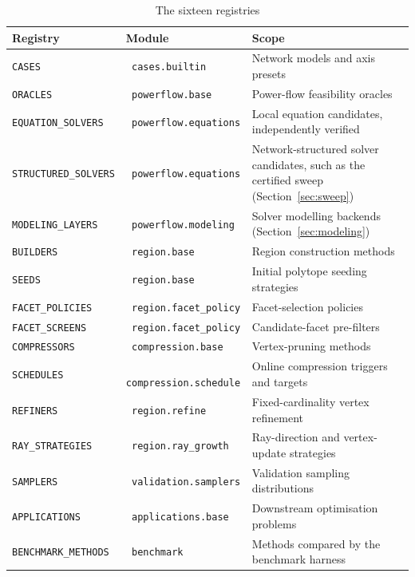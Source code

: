 \documentclass[11pt,a4paper]{report}
\newcommand{\code}[1]{\texttt{\small #1}}
\newcommand{\pymod}[1]{\texttt{\small\color{nbblue} #1}}
\begin{document}
\begin{table}[h]
\centering\small
\caption{The sixteen registries}
\begin{tabular}{@{}llp{6.4cm}@{}}
\toprule
Registry & Module & Scope \\
\midrule
\code{CASES}           & \pymod{cases.builtin}        & Network models and axis presets \\
\code{ORACLES}         & \pymod{powerflow.base}       & Power-flow feasibility oracles \\
\code{EQUATION\_SOLVERS} & \pymod{powerflow.equations} & Local equation candidates, independently verified \\
\code{STRUCTURED\_SOLVERS} & \pymod{powerflow.equations} & Network-structured solver candidates, such as the certified sweep (Section~\ref{sec:sweep}) \\
\code{MODELING\_LAYERS} & \pymod{powerflow.modeling} & Solver modelling backends (Section~\ref{sec:modeling}) \\
\code{BUILDERS}        & \pymod{region.base}          & Region construction methods \\
\code{SEEDS}           & \pymod{region.base}          & Initial polytope seeding strategies \\
\code{FACET\_POLICIES} & \pymod{region.facet\_policy} & Facet-selection policies \\
\code{FACET\_SCREENS}  & \pymod{region.facet\_policy} & Candidate-facet pre-filters \\
\code{COMPRESSORS}     & \pymod{compression.base}     & Vertex-pruning methods \\
\code{SCHEDULES}       & \pymod{compression.schedule} & Online compression triggers and targets \\
\code{REFINERS}        & \pymod{region.refine}        & Fixed-cardinality vertex refinement \\
\code{RAY\_STRATEGIES} & \pymod{region.ray\_growth}   & Ray-direction and vertex-update strategies \\
\code{SAMPLERS}        & \pymod{validation.samplers}  & Validation sampling distributions \\
\code{APPLICATIONS}    & \pymod{applications.base}    & Downstream optimisation problems \\
\code{BENCHMARK\_METHODS} & \pymod{benchmark}          & Methods compared by the benchmark harness \\
\bottomrule
\end{tabular}
\end{table}
\end{document}
